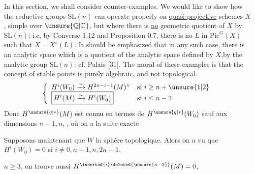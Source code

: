  In this section, we shall consider counter-examples. We would like to show how the reductive groups $\mathrm{SL}(n)$ can operate properly on \uline{quasi-projective} schemes $X$, simple over $\unsure{\mathbb Q|\mathbb C}$, but where there is \uline{no} geometric quotient of $X$ by $\mathrm{SL}(n)$; i.e, by Converse 1.12 and Proposition 0.7, there is no $L$ in $\mathrm{Pic}^G(X)$ such that $X=X^s(L)$. It should be emphasized that in any such case, there is an analytic space which is a quotient of the analytic space defined by $X$,by the analytic group $\mathrm{SL}(n)$: cf. Palais [31]. The moral of these examples is that the concept of stable points is purely algebraic, and not topological.
\deleted{\[H^i(W_0)=0\quad\text{si }i\ne\unsure{i|1}\]}
\deleted{\[\begin{gathered}\unsure{i=n+1}\\\unsure{2n-i=n-1}\end{gathered}\]}
\[\left\{\begin{array}{ll}
H^i(W_0)\xrightarrow{\sim}H^{2n-i-1}(M)^\vee&\text{si }i\ge n+\unsure{1|2}\\
\boxed{H^i(M)\xrightarrow{\sim}H^i(W_0)}&\text{si }i\le n-2
\end{array}\right.\]
Donc $H^{\unsure{q|*}}(M)$ est connu en termes de $H^{\unsure{q|*}}(W_0)$ sauf aux dimensions  $n-1,n$, , où on a la suite exacte

Supposons maintenant que $W$  la sphère topologique. Alors on a vu que $H^i(W_0)=0$ si $i\ne0,n-1,n,2n-1$.

 \textcircled{$n\ge3$}, on trouve aussi \uline{$H^{\inserted{i}\deleted{\unsure{n-2}}}(M)=0$}, 

